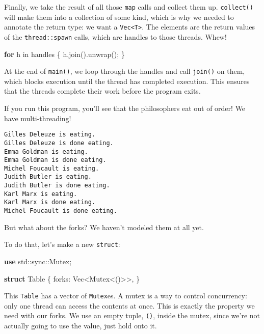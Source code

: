 \documentclass[a4paper,]{book}
\newenvironment{Shaded}{\begin{snugshade}}{\end{snugshade}}
\newcommand{\KeywordTok}[1]{\textcolor[rgb]{0.13,0.29,0.53}{\textbf{{#1}}}}
\newcommand{\NormalTok}[1]{{#1}}
\begin{document}
Finally, we take the result of all those \texttt{map} calls and collect
them up. \texttt{collect()} will make them into a collection of some
kind, which is why we needed to annotate the return type: we want a
\texttt{Vec\textless{}T\textgreater{}}. The elements are the return
values of the \texttt{thread::spawn} calls, which are handles to those
threads. Whew!

\begin{Shaded}
\begin{Highlighting}[]
\KeywordTok{for} \NormalTok{h in handles \{}
    \NormalTok{h.join().unwrap();}
\NormalTok{\}}
\end{Highlighting}
\end{Shaded}

At the end of \texttt{main()}, we loop through the handles and call
\texttt{join()} on them, which blocks execution until the thread has
completed execution. This ensures that the threads complete their work
before the program exits.

If you run this program, you'll see that the philosophers eat out of
order! We have multi-threading!

\begin{verbatim}
Gilles Deleuze is eating.
Gilles Deleuze is done eating.
Emma Goldman is eating.
Emma Goldman is done eating.
Michel Foucault is eating.
Judith Butler is eating.
Judith Butler is done eating.
Karl Marx is eating.
Karl Marx is done eating.
Michel Foucault is done eating.
\end{verbatim}

But what about the forks? We haven't modeled them at all yet.

To do that, let's make a new \texttt{struct}:

\begin{Shaded}
\begin{Highlighting}[]
\KeywordTok{use} \NormalTok{std::sync::Mutex;}

\KeywordTok{struct} \NormalTok{Table \{}
    \NormalTok{forks: Vec<Mutex<()>>,}
\NormalTok{\}}
\end{Highlighting}
\end{Shaded}

This \texttt{Table} has a vector of \texttt{Mutex}es. A mutex is a way
to control concurrency: only one thread can access the contents at once.
This is exactly the property we need with our forks. We use an empty
tuple, \texttt{()}, inside the mutex, since we're not actually going to
use the value, just hold onto it.
\end{document}
